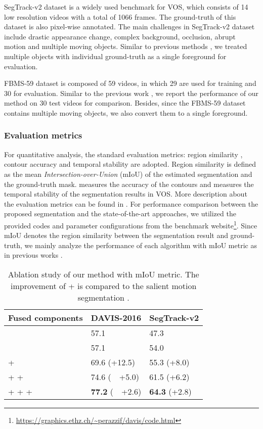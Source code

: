 \documentclass[journal]{IEEEtran}
\begin{document}
SegTrack-v2 dataset \cite{ICCV2013_Li} is a widely used benchmark for VOS,
which consists of 14 low resolution videos with a total of 1066 frames. The ground-truth of this dataset is also pixel-wise annotated. 
The main challenges in SegTrack-v2 dataset include drastic appearance change, complex background, occlusion, abrupt motion and multiple moving objects.
Similar to previous methods \cite{BMVC2014_Faktor,CVPR2017_Jain},
we treated multiple objects with individual ground-truth as a single foreground for evaluation.

FBMS-59 dataset is composed of 59 videos, in which 29 are used for training and 30 for evaluation. Similar to the previous work \cite{CVPR2017_Koh}, we report the performance of our method on 30 test videos for comparison. Besides, since the FBMS-59 dataset contains multiple moving objects, we also convert them to a single foreground.

\subsubsection{Evaluation metrics}
For quantitative analysis, 
the standard evaluation metrics: region similarity , contour accuracy  and temporal stability  are adopted. 
Region similarity  is defined as the mean \emph{Intersection-over-Union} (mIoU) of the estimated segmentation and the ground-truth mask.
 measures the accuracy of the contours and  measures the temporal stability of the segmentation results in VOS. 
More description about the evaluation metrics can be found in \cite{CVPR2016_Perazzi}.
For performance comparison between the proposed segmentation and the state-of-the-art approaches, 
we utilized the provided codes and parameter configurations from the benchmark website\footnote{\url{https://graphics.ethz.ch/~perazzif/davis/code.html}}.
Since mIoU denotes the region similarity between the segmentation result and ground-truth, 
we mainly analyze the performance of each algorithm with mIoU metric as in previous works \cite{CVPR2017_Tokmakov,BMVC2014_Faktor,CVPR2017_Koh,CVPR2017_Jain}.


\begin{table}
	\centering 
	\caption{Ablation study of our method with mIoU metric.
		The improvement of + is compared to the salient motion segmentation .}
    \begin{tabular}{L{18ex}|C{15ex}|C{15ex}} \toprule
    Fused components                                          & DAVIS-2016         & SegTrack-v2 \\ \midrule
                                                 & 57.1               & 47.3        \\
                                                 & 57.1               & 54.0        \\
     +                                & 69.6 (+12.5)       & 55.3 (+8.0)        \\
     +  +                  & 74.6 (~~+5.0)        & 61.5 (+6.2)        \\
     +  +  +    & {\bf 77.2} (~~+2.6)  & {\bf 64.3} (+2.8)  \\ \bottomrule
    \end{tabular}
    \label{tbl_modality}
\end{table} 
\end{document}
